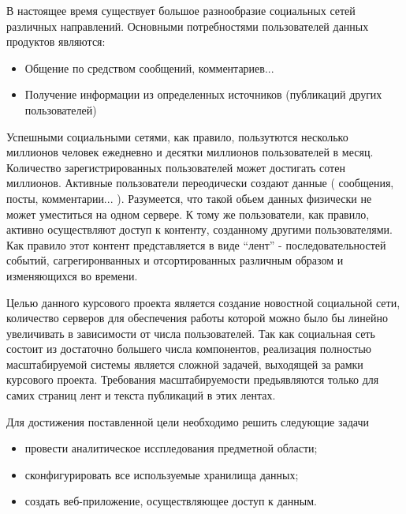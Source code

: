 \Introduction

В настоящее время существует большое разнообразие социальных сетей различных направлений. Основными потребностями пользователей данных продуктов являются:
\begin{itemize}
\item Общение по средством сообщений, комментариев...
\item Получение информации из определенных источников (публикаций других пользователей)
\end{itemize}

Успешными социальными сетями, как правило, пользутются несколько миллионов человек ежедневно и десятки миллионов пользователей в месяц. 
Количество зарегистрированных пользователей может достигать сотен миллионов.
Активные пользователи переодически создают данные ( сообщения, посты, комментарии... ).
Разумеется, что такой обьем данных физически не может уместиться на одном сервере.
К тому же пользователи, как правило, активно осуществляют доступ к контенту,
созданному другими пользователями.
Как правило этот контент представляется в виде ``лент'' - последовательностей событий, сагрегиронванных и отсортированных различным образом и изменяющихся во времени.

Целью данного курсового проекта является создание новостной социальной сети,
количество серверов для обеспечения работы которой 
можно было бы линейно увеличивать в зависимости от числа пользователей.
Так как социальная сеть состоит из достаточно большего числа компонентов,
реализация полностью масштабируемой системы является сложной задачей,
выходящей за рамки курсового проекта.
Требования масштабируемости предьявляются только для самих страниц лент и текста
публикаций в этих лентах.

Для достижения поставленной цели необходимо решить следующие задачи%
\begin{itemize}
\item провести аналитическое исспледования предметной области;
\item сконфигурировать все используемые хранилища данных;
\item создать веб-приложение, осуществляющее доступ к данным.
\end{itemize}



